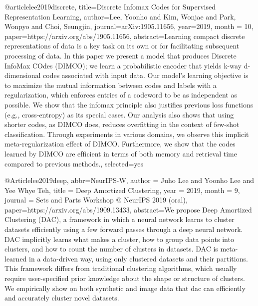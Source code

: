 @article{lee2019discrete,
  title={Discrete Infomax Codes for Supervised Representation Learning},
  author={Lee, Yoonho and Kim, Wonjae and Park, Wonpyo and Choi, Seungjin},
  journal={arXiv:1905.11656},
  year={2019},
  month = {10},
  paper={https://arxiv.org/abs/1905.11656},
  abstract={Learning compact discrete representations of data is a key task on its own or for facilitating subsequent processing of data. In this paper we present a model that produces Discrete InfoMax COdes (DIMCO); we learn a probabilistic encoder that yields k-way d-dimensional codes associated with input data. Our model’s learning objective is to maximize the mutual information between codes and labels with a regularization, which enforces entries of a codeword to be as independent as possible. We show that the infomax principle also justiﬁes previous loss functions (e.g., cross-entropy) as its special cases. Our analysis also shows that using shorter codes, as DIMCO does, reduces overﬁtting in the context of few-shot classiﬁcation. Through experiments in various domains, we observe this implicit meta-regularization effect of DIMCO. Furthermore, we show that the codes learned by DIMCO are efﬁcient in terms of both memory and retrieval time compared to previous methods.},
  selected={yes}
}

@Article{lee2019deep,
  abbr={NeurIPS-W},
  author        = {Juho Lee and Yoonho Lee and Yee Whye Teh},
  title         = {Deep Amortized Clustering},
  year          = {2019},
  month = {9},
  journal = {Sets and Parts Workshop @ NeurIPS 2019 (oral)},
  paper={https://arxiv.org/abs/1909.13433},
  abstract={We propose Deep Amortized Clustering (DAC), a framework in which a neural network learns to cluster datasets efficiently using a few forward passes through a deep neural network. DAC implicitly learns what makes a cluster, how to group data points into clusters, and how to count the number of clusters in datasets. DAC is meta-learned in a data-driven way, using only clustered datasets and their partitions. This framework differs from traditional clustering algorithms, which usually require user-specified prior knowledge about the shape or structure of clusters. We empirically show on both synthetic and image data that \gls{dac} can efficiently and accurately cluster novel datasets.}
}

